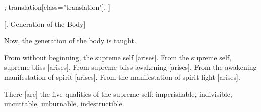 \begin{alignment}[
  texts=edition[class="edition"];
  translation[class="translation"],
  ]
\begin{translation}
\begin{tlate}
    \end{tlate}
    \begin{tlate}
      \bigskip
       \centerline{\textrm{\small{[. Generation of the Body]}}}
\bigskip
Now, the generation of the body is taught.

From without beginning, the supreme self [arises]. From the supreme self, supreme bliss [arises]. From supreme bliss awakening [arises]. From the awakening manifestation of spirit [arises]. From the manifestation of spirit light [arises].

There [are] the five qualities of the supreme self: imperishable, indivisible, uncuttable, unburnable, indestructible.
    \end{tlate}
  \end{translation}
\end{alignment}
\pagebreak %
